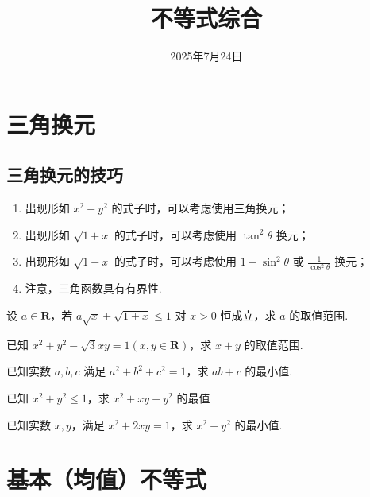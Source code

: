 \documentclass[a4paper , final]{ctexart}
\title{不等式综合}
\date{2025年7月24日}
\newenvironment{problem}[1]{%
  \item #1
  \par
  \vspace{8cm}
}{}
\begin{document}
\maketitle

\section*{三角换元}

\subsection*{三角换元的技巧}
\begin{enumerate}
  \item 出现形如 $x^2+y^2$ 的式子时，可以考虑使用三角换元；
  \item 出现形如 $\sqrt{1+x}$ 的式子时，可以考虑使用 $\tan^2\theta$ 换元；
  \item 出现形如 $\sqrt{1-x}$ 的式子时，可以考虑使用 $1-\sin^2\theta$ 或 $\frac{1}{\cos^2\theta}$ 换元；
  \item  注意，三角函数具有有界性.
\end{enumerate}

\begin{problems}
  \begin{problem}
    {
      设 $a\in\mathbf{R}$，若 $a\sqrt{x}+\sqrt{1+x}\leq 1$ 对 $x>0$ 恒成立，求 $a$ 的取值范围.
    }
  \end{problem}

  \begin{problem}
    {
      已知 $x^2+y^2-\sqrt{3}xy = 1(x,y\in\mathbf{R})$，求 $x+y$ 的取值范围.
    }
  \end{problem}
\newpage
  \begin{problem}
    {
      已知实数 $a,b,c$ 满足 $a^2+b^2+c^2=1$，求 $ab+c$ 的最小值.
    }
  \end{problem}

  \begin{problem}
    {
      已知 $x^2+y^2\leq 1$，求 $x^2+xy-y^2$ 的最值
    }
  \end{problem}

  \begin{problem}
    {
      已知实数 $x,y$，满足 $x^2+2xy=1$，求 $x^2+y^2$ 的最小值.
    }
  \end{problem}
\end{problems}

\section*{基本（均值）不等式}
\end{document}
